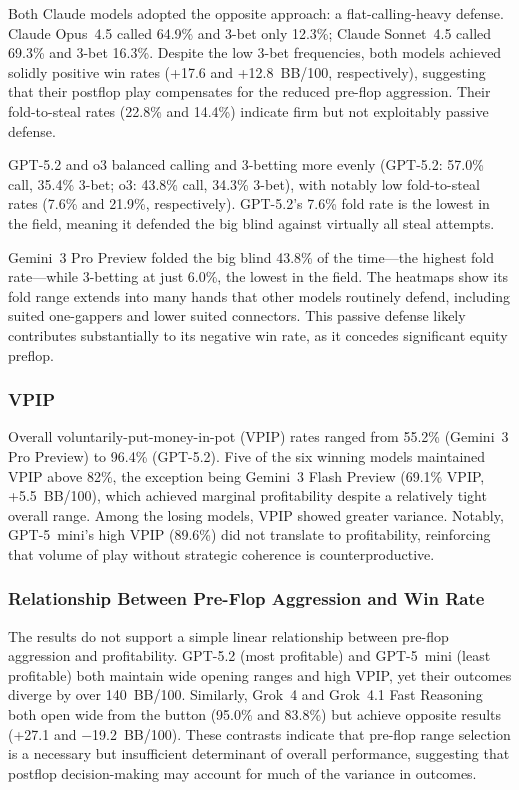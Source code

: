 \documentclass{article}
\begin{document}
Both Claude models adopted the opposite approach: a flat-calling-heavy defense. Claude Opus~4.5 called 64.9\% and 3-bet only 12.3\%; Claude Sonnet~4.5 called 69.3\% and 3-bet 16.3\%. Despite the low 3-bet frequencies, both models achieved solidly positive win rates (+17.6 and +12.8~BB/100, respectively), suggesting that their postflop play compensates for the reduced pre-flop aggression. Their fold-to-steal rates (22.8\% and 14.4\%) indicate firm but not exploitably passive defense.

GPT-5.2 and o3 balanced calling and 3-betting more evenly (GPT-5.2: 57.0\% call, 35.4\% 3-bet; o3: 43.8\% call, 34.3\% 3-bet), with notably low fold-to-steal rates (7.6\% and 21.9\%, respectively). GPT-5.2's 7.6\% fold rate is the lowest in the field, meaning it defended the big blind against virtually all steal attempts.

Gemini~3 Pro Preview folded the big blind 43.8\% of the time---the highest fold rate---while 3-betting at just 6.0\%, the lowest in the field. The heatmaps show its fold range extends into many hands that other models routinely defend, including suited one-gappers and lower suited connectors. This passive defense likely contributes substantially to its negative win rate, as it concedes significant equity preflop.

\subsubsection{VPIP}

Overall voluntarily-put-money-in-pot (VPIP) rates ranged from 55.2\% (Gemini~3 Pro Preview) to 96.4\% (GPT-5.2). Five of the six winning models maintained VPIP above 82\%, the exception being Gemini~3 Flash Preview (69.1\% VPIP, +5.5~BB/100), which achieved marginal profitability despite a relatively tight overall range. Among the losing models, VPIP showed greater variance. Notably, GPT-5~mini's high VPIP (89.6\%) did not translate to profitability, reinforcing that volume of play without strategic coherence is counterproductive.

\subsubsection{Relationship Between Pre-Flop Aggression and Win Rate}

The results do not support a simple linear relationship between pre-flop aggression and profitability. GPT-5.2 (most profitable) and GPT-5~mini (least profitable) both maintain wide opening ranges and high VPIP, yet their outcomes diverge by over 140~BB/100. Similarly, Grok~4 and Grok~4.1 Fast Reasoning both open wide from the button (95.0\% and 83.8\%) but achieve opposite results (+27.1 and $-$19.2~BB/100). These contrasts indicate that pre-flop range selection is a necessary but insufficient determinant of overall performance, suggesting that postflop decision-making may account for much of the variance in outcomes.
\end{document}

